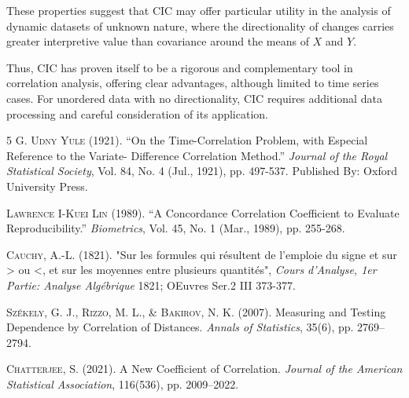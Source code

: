 \documentclass[aos]{imsart}
\newcommand{\cic}{\text{CIC}}
\begin{document}
These properties suggest that $\cic$ may offer particular utility in the analysis of dynamic datasets of unknown nature, where the directionality of changes carries greater interpretive value than covariance around the means of $X$ and $Y$.

Thus, $\cic$ has proven itself to be a rigorous and complementary tool in correlation analysis, offering clear advantages, although limited to time series cases. For unordered data with no directionality, $\cic$ requires additional data processing and careful consideration of its application.


\begin{thebibliography}{5}
\textsc{G. Udny Yule} (1921). “On the Time-Correlation Problem, with Especial Reference to the Variate- Difference Correlation Method.” \textit{Journal of the Royal Statistical Society}, Vol. 84, No. 4 (Jul., 1921), pp. 497-537. Published By: Oxford University Press.

\textsc{Lawrence I-Kuei Lin} (1989). “A Concordance Correlation Coefficient to Evaluate Reproducibility.” \textit{Biometrics}, Vol. 45, No. 1 (Mar., 1989), pp. 255-268.

\textsc{Cauchy, A.-L.} (1821). "Sur les formules qui résultent de l'emploie du signe et sur > ou <, et sur les moyennes entre plusieurs quantités", \textit{Cours d'Analyse, 1er Partie: Analyse Algébrique} 1821; OEuvres Ser.2 III 373-377.

\textsc{Székely, G. J., Rizzo, M. L., \& Bakirov, N. K.} (2007). Measuring and Testing Dependence by Correlation of Distances. \textit{Annals of Statistics}, 35(6), pp. 2769–2794.

\textsc{Chatterjee, S.} (2021). A New Coefficient of Correlation. \textit{Journal of the American Statistical Association}, 116(536), pp. 2009–2022.
\end{thebibliography}
\end{document}
